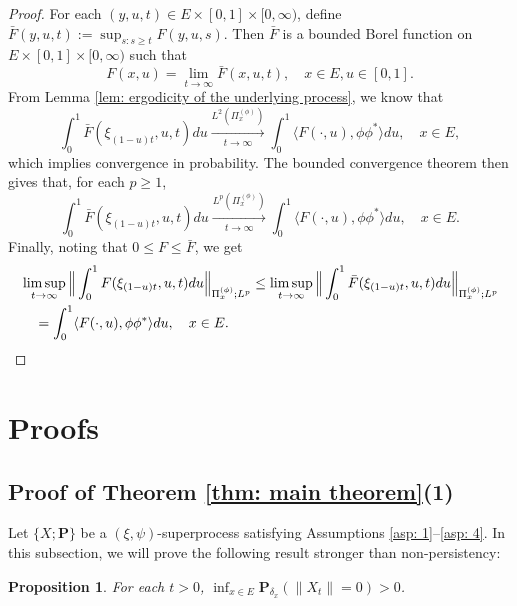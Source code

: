 \documentclass[12pt, a4paper]{amsart}
\newtheorem{prop}[thm]{Proposition}
\theoremstyle{definition}
\numberwithin{equation}{section}
\begin{document}
\begin{proof}
	For each $(y,u,t)\in E\times [0,1]\times [0,\infty)$, define $\bar F(y,u,t) := \sup_{s:s\geq t} F(y,u,s)$.
	Then $\bar F$ is a bounded Borel  function on $E\times [0,1]\times [0,\infty)$ such that
\begin{equation}
	F(x,u)
	= \lim_{t\to \infty} \bar F(x,u,t),
	\quad x\in E, u\in [0,1].
\end{equation}
	From Lemma \ref{lem: ergodicity of the underlying process}, we know that
\begin{equation}
	\int_0^1 \bar F(\xi_{(1-u)t},u,t) du
	\xrightarrow[t\to \infty]{L^2(\Pi_x^{(\phi)})}
	\int_0^1 \langle F(\cdot , u), \phi\phi^*\rangle du,
	\quad x\in E,
\end{equation}
    which implies convergence in probability.
	The bounded convergence theorem then gives that, for each $p \geq 1$,
\begin{equation}
	\int_0^1 \bar F(\xi_{(1-u)t},u,t) du
	\xrightarrow[t\to \infty]{L^p(\Pi_x^{(\phi)})}
	\int_0^1 \langle F(\cdot , u), \phi\phi^*\rangle du,
	\quad x\in E.
\end{equation}
	Finally,
    noting that $0\leq F \leq \bar F$, we get
\begin{equation}\begin{split}
	& \limsup_{ t \to \infty}  \Big\| \int_0^1 F(\xi_{(1-u) t },u,t) du  \Big\|_{\Pi_x^{(\phi)};L^p}
	\leq 	\limsup_{ t \to \infty}  \Big\| \int_0^1 \bar F(\xi_{(1-u) t },u,t) du  \Big\|_{\Pi_x^{(\phi)};L^p}
	\\& \quad = \int_0^1 \langle F(\cdot, u), \phi \phi^*\rangle du,
	\quad x\in E. \qedhere
\end{split}\end{equation}
\end{proof}

\section{Proofs}
\subsection{Proof of Theorem \ref{thm: main theorem}(1)}
\label{sec: proof of result 1}
	Let $\{X; \mathbf P\}$ be a $(\xi, \psi)$-superprocess satisfying
	Assumptions \ref{asp: 1}--\ref{asp: 4}.
	In this subsection, we will prove the following result stronger than non-persistency:

\begin{prop} \label{prop: non-presistent}
	For each $t > 0$, $\inf_{x\in E} \mathbf P_{\delta_x}(\|X_t\|= 0) > 0$.
\end{prop}
\end{document}
